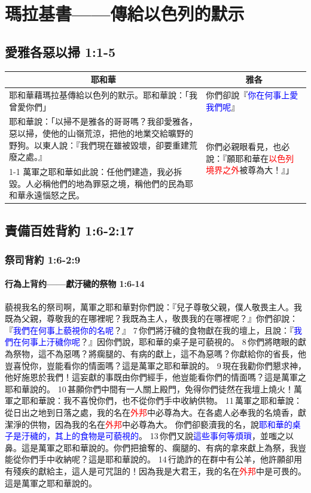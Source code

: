 \chapter{瑪拉基書——傳給以色列的默示}
\section{愛雅各惡以掃 1:1-5}
\begin{table}[H]
\centering
\begin{tabular}{p{12.5cm}|p{}}\hline\hline
\multicolumn{1}{c|}{耶和華}&\multicolumn{1}{c}{雅各}\\\hline
耶和華藉瑪拉基傳給以色列的默示。耶和華說：「我曾愛你們」
&你們卻說『\textcolor{blue}{你在何事上愛我們呢}』\\\hline
耶和華說：「以掃不是雅各的哥哥嗎？我卻愛雅各，惡以掃，使他的山嶺荒涼，把他的地業交給曠野的野狗。以東人說：『我們現在雖被毀壞，卻要重建荒廢之處。』
&\multirow{2}{5.cm}{你們必親眼看見，也必說：『願耶和華在\textcolor{red}{以色列境界之外}被尊為大！』」}\\\cline{1-1}
萬軍之耶和華如此說：任他們建造，我必拆毀。人必稱他們的地為罪惡之境，稱他們的民為耶和華永遠惱怒之民。&\\\hline
\end{tabular}
\end{table}


\section{責備百姓背約 1:6-2:17}
\subsection{祭司背約 1:6-2:9}
\subsubsection{行為上背约——獻汙穢的祭物 1:6-14}
藐視我名的祭司啊，萬軍之耶和華對你們說：『兒子尊敬父親，僕人敬畏主人。我既為父親，尊敬我的在哪裡呢？我既為主人，敬畏我的在哪裡呢？』你們卻說：『\textcolor{blue}{我們在何事上藐視你的名呢}？』 7 你們將汙穢的食物獻在我的壇上，且說：『\textcolor{blue}{我們在何事上汙穢你呢}？』因你們說，耶和華的桌子是可藐視的。 8 你們將瞎眼的獻為祭物，這不為惡嗎？將瘸腿的、有病的獻上，這不為惡嗎？你獻給你的省長，他豈喜悅你，豈能看你的情面嗎？這是萬軍之耶和華說的。 9 現在我勸你們懇求神，他好施恩於我們！這妄獻的事既由你們經手，他豈能看你們的情面嗎？這是萬軍之耶和華說的。 10 甚願你們中間有一人關上殿門，免得你們徒然在我壇上燒火！萬軍之耶和華說：我不喜悅你們，也不從你們手中收納供物。 11 萬軍之耶和華說：從日出之地到日落之處，我的名在\textcolor{red}{外邦}中必尊為大。在各處人必奉我的名燒香，獻潔淨的供物，因為我的名在\textcolor{red}{外邦}中必尊為大。
你們卻褻瀆我的名，說\textcolor{blue}{耶和華的桌子是汙穢的，其上的食物是可藐視的}。 13 你們又說\textcolor{blue}{這些事何等煩瑣}，並嗤之以鼻。這是萬軍之耶和華說的。你們把搶奪的、瘸腿的、有病的拿來獻上為祭，我豈能從你們手中收納呢？這是耶和華說的。 14 行詭詐的在群中有公羊，他許願卻用有殘疾的獻給主，這人是可咒詛的！因為我是大君王，我的名在\textcolor{red}{外邦}中是可畏的。這是萬軍之耶和華說的。

